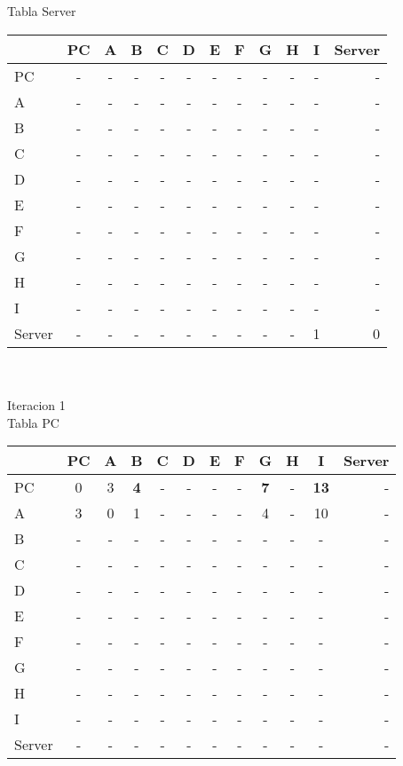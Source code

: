 \documentclass{article}
\begin{document}
\\
\\
Tabla Server \\
\begin{tabular}{l*{10}{c}r}
              & PC & A & B & C & D & E & F & G & H & I & Server \\
\hline
PC             & - & - & - & - & - & - & - & - & - & - & -\\
A              & - & - & - & - & - & - & - & - & - & - & -\\
B              & - & - & - & - & - & - & - & - & - & - & -\\
C              & - & - & - & - & - & - & - & - & - & - & -\\
D              & - & - & - & - & - & - & - & - & - & - & -\\
E              & - & - & - & - & - & - & - & - & - & - & -\\
F              & - & - & - & - & - & - & - & - & - & - & -\\
G              & - & - & - & - & - & - & - & - & - & - & -\\
H              & - & - & - & - & - & - & - & - & - & - & -\\
I              & - & - & - & - & - & - & - & - & - & - & -\\
Server         & - & - & - & - & - & - & - & - & - & 1 & 0\\

\end{tabular}
\\
\\
Iteracion 1
\\
Tabla PC\\
\begin{tabular}{l*{10}{c}r}
              & PC & A & B & C & D & E & F  & G & H & I & Server \\
\hline
PC             & 0 & 3 &{\bf{4}}& - & - & - & - &{\bf{7}}& - &\textbf{13}& - \\
A              & 3 & 0 & 1 & - & - & - & - & 4 & - & 10 & -\\
B              & - & - & - & - & - & - & - & - & - & - & - \\
C              & - & - & - & - & - & - & - & - & - & - & - \\
D              & - & - & - & - & - & - & - & - & - & - & - \\
E              & - & - & - & - & - & - & - & - & - & - & - \\
F              & - & - & - & - & - & - & - & - & - & - & - \\
G              & - & - & - & - & - & - & - & - & - & - & - \\
H              & - & - & - & - & - & - & - & - & - & - & - \\
I              & - & - & - & - & - & - & - & - & - & - & - \\
Server         & - & - & - & - & - & - & - & - & - & - & - \\	

\end{tabular}
\end{document}
